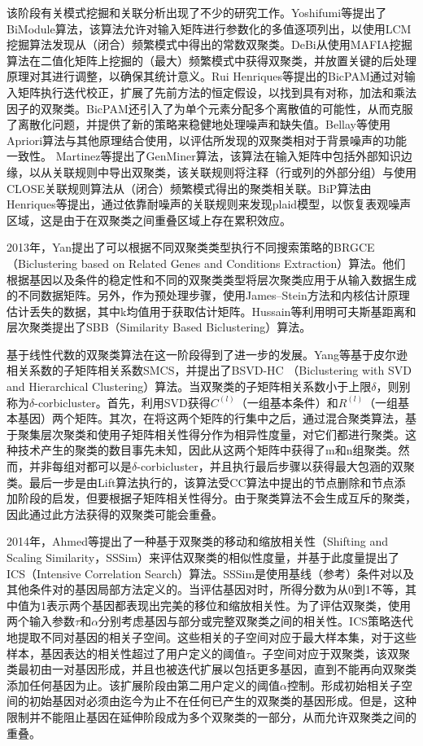     该阶段有关模式挖掘和关联分析出现了不少的研究工作。Yoshifumi等提出了BiModule算法，该算法允许对输入矩阵进行参数化的多值逐项列出，以使用LCM挖掘算法发现从（闭合）频繁模式中得出的常数双聚类。DeBi从使用MAFIA挖掘算法在二值化矩阵上挖掘的（最大）频繁模式中获得双聚类，并放置关键的后处理原理对其进行调整，以确保其统计意义。Rui Henriques等提出的BicPAM通过对输入矩阵执行迭代校正，扩展了先前方法的恒定假设，以找到具有对称，加法和乘法因子的双聚类。BicPAM还引入了为单个元素分配多个离散值的可能性，从而克服了离散化问题，并提供了新的策略来稳健地处理噪声和缺失值。Bellay等使用Apriori算法与其他原理结合使用，以评估所发现的双聚类相对于背景噪声的功能一致性。 Martinez等提出了GenMiner算法，该算法在输入矩阵中包括外部知识边缘，以从关联规则中导出双聚类，该关联规则将注释（行或列的外部分组）与使用CLOSE关联规则算法从（闭合）频繁模式得出的聚类相关联。BiP算法由Henriques等提出，通过依靠耐噪声的关联规则来发现plaid模型，以恢复表观噪声区域，这是由于在双聚类之间重叠区域上存在累积效应。

    2013年，Yan提出了可以根据不同双聚类类型执行不同搜索策略的BRGCE（Biclustering based on Related Genes and Conditions Extraction）算法。他们根据基因以及条件的稳定性和不同的双聚类类型将层次聚类应用于从输入数据生成的不同数据矩阵。另外，作为预处理步骤，使用James–Stein方法和内核估计原理估计丢失的数据，其中k均值用于获取估计矩阵。Hussain等利用明可夫斯基距离和层次聚类提出了SBB（Similarity Based Biclustering）算法。

    基于线性代数的双聚类算法在这一阶段得到了进一步的发展。Yang等基于皮尔逊相关系数的子矩阵相关系数SMCS，并提出了BSVD-HC （Biclustering with SVD and Hierarchical Clustering）算法。当双聚类的子矩阵相关系数小于上限$\delta$，则别称为$\delta$-corbicluster。首先，利用SVD获得$C^{(l)}$（一组基本条件）和$R^{(l)}$（一组基本基因）两个矩阵。其次，在将这两个矩阵的行集中之后，通过混合聚类算法，基于聚集层次聚类和使用子矩阵相关性得分作为相异性度量，对它们都进行聚类。这种技术产生的聚类的数目事先未知，因此从这两个矩阵中获得了m和n组聚类。然而，并非每组对都可以是$\delta$-corbicluster，并且执行最后步骤以获得最大包涵的双聚类。最后一步是由Lift算法执行的，该算法受CC算法中提出的节点删除和节点添加阶段的启发，但要根据子矩阵相关性得分。由于聚类算法不会生成互斥的聚类，因此通过此方法获得的双聚类可能会重叠。
    
    2014年，Ahmed等提出了一种基于双聚类的移动和缩放相关性（Shifting and Scaling Similarity，SSSim）来评估双聚类的相似性度量，并基于此度量提出了ICS（Intensive Correlation Search）算法。SSSim是使用基线（参考）条件对以及其他条件对的基因局部方法定义的。当评估基因对时，所得分数为从0到1不等，其中值为1表示两个基因都表现出完美的移位和缩放相关性。为了评估双聚类，使用两个输入参数$\tau$和$\alpha$分别考虑基因与部分或完整双聚类之间的相关性。ICS策略迭代地提取不同对基因的相关子空间。这些相关的子空间对应于最大样本集，对于这些样本，基因表达的相关性超过了用户定义的阈值$\tau$。子空间对应于双聚类，该双聚类最初由一对基因形成，并且也被迭代扩展以包括更多基因，直到不能再向双聚类添加任何基因为止。该扩展阶段由第二用户定义的阈值$\alpha$控制。形成初始相关子空间的初始基因对必须由迄今为止不在任何已产生的双聚类的基因形成。但是，这种限制并不能阻止基因在延伸阶段成为多个双聚类的一部分，从而允许双聚类之间的重叠。

